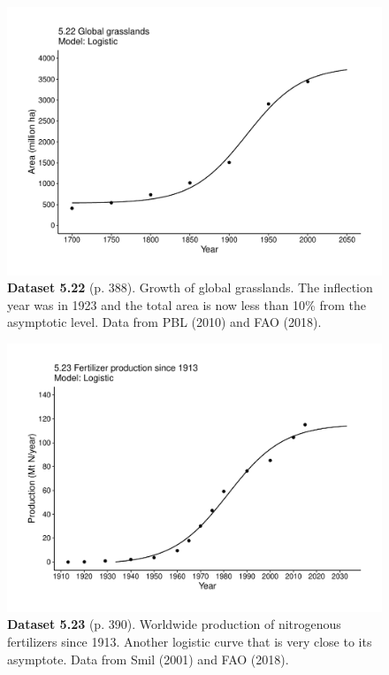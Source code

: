\documentclass[aps,rmp,preprint,superscriptaddress,10pt,onecolumn]{article}
\begin{document}
\clearpage
\begin{figure}[h]
\includegraphics[width=\textwidth]{output/figs-ggplot/5.22.pdf}
\caption*{\textbf{Dataset 5.22} (p. 388). Growth of global grasslands. The inflection year was in 1923 and the total area is now less than 10\% from the asymptotic level. Data from PBL (2010) and FAO (2018).}
\end{figure}
	
\clearpage
\begin{figure}[h]
\includegraphics[width=\textwidth]{output/figs-ggplot/5.23.pdf}
\caption*{\textbf{Dataset 5.23} (p. 390). Worldwide production of nitrogenous fertilizers since 1913. Another logistic curve that is very close to its asymptote. Data from Smil (2001) and FAO (2018).}
\end{figure}
	
\end{document}
